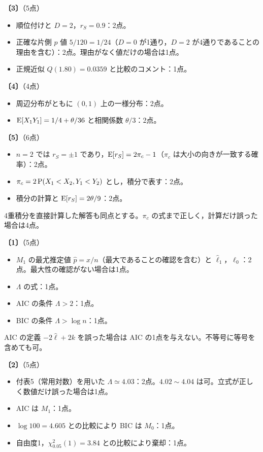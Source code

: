 \documentclass[a4paper,11pt]{ltjsarticle}
\renewcommand{\ans}[1]{\par\medskip\noindent\textbf{〔#1〕}\quad}
\renewcommand{\points}[1]{\hfill\textnormal{（#1点）}\par\nobreak}
\begin{document}
\ans{3}\points{5}
\begin{itemize}
\item 順位付けと $D=2$，$r_S=0.9$：2点。
\item 正確な片側 $p$ 値 $5/120=1/24$（$D=0$ が1通り，$D=2$ が4通りであることの理由を含む）：2点。理由がなく値だけの場合は1点。
\item 正規近似 $Q(1.80)=0.0359$ と比較のコメント：1点。
\end{itemize}

\ans{4}\points{4}
\begin{itemize}
\item 周辺分布がともに $(0,1)$ 上の一様分布：2点。
\item $\operatorname{E}[X_1Y_1]=1/4+\theta/36$ と相関係数 $\theta/3$：2点。
\end{itemize}

\ans{5}\points{6}
\begin{itemize}
\item $n=2$ では $r_S=\pm1$ であり，$\operatorname{E}[r_S]=2\pi_c-1$（$\pi_c$ は大小の向きが一致する確率）：2点。
\item $\pi_c=2\operatorname{P}(X_1<X_2,Y_1<Y_2)$ とし，積分で表す：2点。
\item 積分の計算と $\operatorname{E}[r_S]=2\theta/9$：2点。
\end{itemize}
4重積分を直接計算した解答も同点とする。$\pi_c$ の式まで正しく，計算だけ誤った場合は4点。
\newpage

\ans{1}\points{5}
\begin{itemize}
\item $M_1$ の最尤推定値 $\hat p=x/n$（最大であることの確認を含む）と $\hat\ell_1$，$\hat\ell_0$：2点。最大性の確認がない場合は1点。
\item $\Lambda$ の式：1点。
\item AIC の条件 $\Lambda>2$：1点。
\item BIC の条件 $\Lambda>\log n$：1点。
\end{itemize}
AIC の定義 $-2\hat\ell+2k$ を誤った場合は AIC の1点を与えない。不等号に等号を含めても可。

\ans{2}\points{5}
\begin{itemize}
\item 付表5（常用対数）を用いた $\Lambda\simeq4.03$：2点。$4.02\sim4.04$ は可。立式が正しく数値だけ誤った場合は1点。
\item AIC は $M_1$：1点。
\item $\log100=4.605$ との比較により BIC は $M_0$：1点。
\item 自由度1，$\chi^2_{0.05}(1)=3.84$ との比較により棄却：1点。
\end{itemize}
\end{document}
